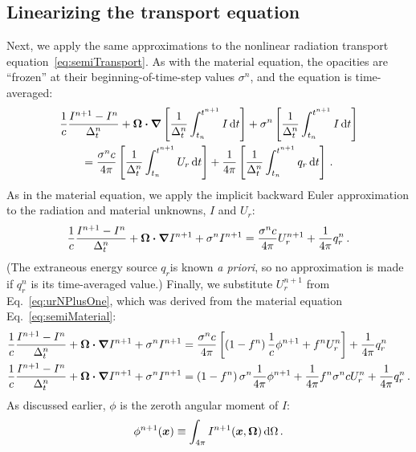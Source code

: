 \subsection{Linearizing the transport equation}
Next, we apply the same approximations to the nonlinear radiation
transport equation~\eqref{eq:semiTransport}. As with the material equation,
the
opacities are ``frozen'' at their beginning-of-time-step values $\sigma^n$, and
the equation is time-averaged:
\begin{multline*}
  \frac{1}{c} \frac{I^{n+1} - I^n}{\Delta_t^n}
  + \bm{\Omega} \bm{\cdot} \bm{\nabla} \left[
  \frac{1}{\Delta_t^n}\int_{t_n}^{t^{n+1}} I\mathop{}\!\mathrm{d} t
  \right] +
 \sigma^n \left[
  \frac{1}{\Delta_t^n}\int_{t_n}^{t^{n+1}} I\mathop{}\!\mathrm{d} t
  \right]
  \\
  = \frac{\sigma^n c}{4\pi} \left[
  \frac{1}{\Delta_t^n}\int_{t_n}^{t^{n+1}} U_r \mathop{}\!\mathrm{d} t \right]
  + \frac{1}{4\pi}\left[
  \frac{1}{\Delta_t^n}\int_{t_n}^{t^{n+1}} q_r \mathop{}\!\mathrm{d} t \right] \,.
\end{multline*}
As in the material equation, we apply the implicit backward Euler approximation
to the radiation and
material unknowns, $I$ and $U_r$:
\begin{equation*}
  \frac{1}{c} \frac{I^{n+1} - I^n}{\Delta_t^n}
  + \bm{\Omega} \bm{\cdot} \bm{\nabla} I^{n+1}
 + \sigma^n I^{n+1}
 = \frac{\sigma^n c}{4\pi} U_r^{n+1}
  + \frac{1}{4\pi} q_r^n \,.
\end{equation*}
(The extraneous energy source $q_r$is known \emph{a priori}, so no approximation is made if $q_r^n$ is its time-averaged value.)
Finally, we substitute $U_r^{n+1}$ from Eq.~\eqref{eq:urNPlusOne},
which was derived from the material equation Eq.~\eqref{eq:semiMaterial}:
\begin{align}\nonumber
  \frac{1}{c} \frac{I^{n+1} - I^n}{\Delta_t^n}
  + \bm{\Omega} \bm{\cdot} \bm{\nabla} I^{n+1}
 + \sigma^n I^{n+1}
 &= \frac{\sigma^n c}{4\pi} \left[ \left(1 - f^n\right) \frac1c \phi^{n+1} + f^n U_r^n \right]
  + \frac{1}{4\pi} q_r^n
  \\ \label{eq:linearizedGrayTransport}
  \frac{1}{c} \frac{I^{n+1} - I^n}{\Delta_t^n}
  + \bm{\Omega} \bm{\cdot} \bm{\nabla} I^{n+1}
 + \sigma^n I^{n+1}
 &=  \left(1 - f^n\right) \sigma^n \frac{1}{4\pi} \phi^{n+1}
 + \frac{1}{4\pi} f^n \sigma^n c U_r^n
  + \frac{1}{4\pi} q_r^n \,.
\end{align}
As discussed earlier, $\phi$ is the zeroth angular moment of $I$:
\begin{equation*}
  \phi^{n+1}(\bm{x}) \equiv \int_{4\pi} I^{n+1}(\bm{x}, \bm{\Omega}) \mathop{}\!\mathrm{d} \Omega
  \,.
\end{equation*}

